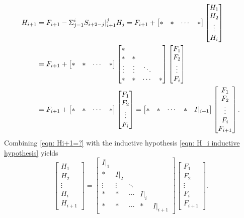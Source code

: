 \documentclass[sort&compress]{elsarticle}
\begin{document}
\begin{align}
H_{i+1}
\notag&
=F_{i+1} - \Sigma_{j=1}^i S_{i+2-j}|_{i+1}^j H_j
=F_{i+1} + \begin{bmatrix}* & * & \cdots & *\end{bmatrix}
\begin{bmatrix}H_1\\ H_2\\ \vdots\\ H_i\end{bmatrix}
\\
\notag&
=F_{i+1} + \begin{bmatrix}* & * & \cdots & *\end{bmatrix}
\begin{bmatrix}
*&&&\\
*&*&\\
\vdots&\vdots&\ddots&\\
*&*&\cdots&*\end{bmatrix}
\begin{bmatrix}F_1\\ F_2\\ \vdots\\ F_i\end{bmatrix}
\\
&\label{eqn: Hi+1=?}
=F_{i+1} + \begin{bmatrix}* & * & \cdots & *\end{bmatrix}
\begin{bmatrix}F_1\\ F_2\\ \vdots\\ F_i\end{bmatrix}
=\begin{bmatrix}* & * & \cdots & * & I|_{i+1}\end{bmatrix}
\begin{bmatrix}F_1\\ F_2\\ \vdots\\ F_i\\ F_{i+1}\end{bmatrix}.
\end{align}
Combining \eqref{eqn: Hi+1=?} with the inductive hypothesis
\eqref{eqn: H_i inductive hypothesis} yields
\[
\begin{bmatrix}H_1\\ H_2\\ \vdots\\ H_i\\ H_{i+1}\end{bmatrix}
=\begin{bmatrix}
I|_1&&&&\\
*&I|_2&&\\
\vdots&\vdots&\ddots&&\\
*&*&\cdots&I|_i&\\
*&*&\cdots&*&I|_{i+1}\end{bmatrix}
\begin{bmatrix}F_1\\ F_2\\ \vdots\\ F_i\\ F_{i+1}\end{bmatrix}.
\]
\end{document}
